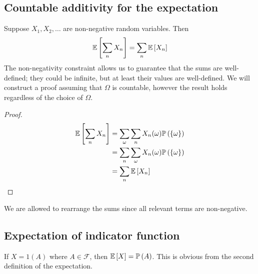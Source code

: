 \subsection{Countable additivity for the expectation}
Suppose \(X_1, X_2, \dots\) are non-negative random variables.
Then
\[
	\mathbb{E}\left[{\sum_n X_n}\right] = \sum_n \mathbb{E}\left[{X_n}\right]
\]
The non-negativity constraint allows us to guarantee that the sums are well-defined; they could be infinite, but at least their values are well-defined.
We will construct a proof assuming that \(\Omega\) is countable, however the result holds regardless of the choice of \(\Omega\).
\begin{proof}
	\begin{align*}
		\mathbb{E}\left[{\sum_n X_n}\right] & = \sum_\omega \sum_n X_n(\omega) \mathbb{P}\left({\{ \omega \}}\right) \\
		                    & = \sum_n \sum_\omega X_n(\omega) \mathbb{P}\left({\{ \omega \}}\right) \\
		                    & = \sum_n \mathbb{E}\left[{X_n}\right]
	\end{align*}
\end{proof}
\noindent We are allowed to rearrange the sums since all relevant terms are non-negative.

\subsection{Expectation of indicator function}
If \(X = 1(A)\) where \(A \in \mathcal F\), then \(\mathbb{E}\left[{X}\right] = \mathbb{P}\left({A}\right)\).
This is obvious from the second definition of the expectation.

